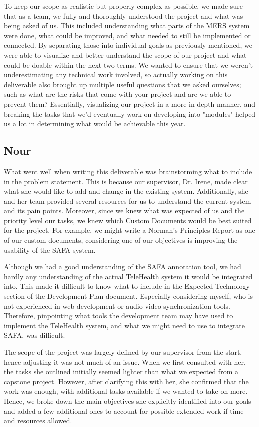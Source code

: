 \documentclass{article}
\begin{document}
To keep our scope as realistic but properly complex as possible, we made sure that as
a team, we fully and thoroughly understood the project and what was being asked of us.
This included understanding what parts of the MERS system were done, what could
be improved, and what needed to still be implemented or connected. By separating those 
into individual goals as previously mentioned, we were able to visualize and
better understand the scope of our project and what could be doable within the next
two terms. We wanted to ensure that we weren't underestimating any technical work
involved, so actually working on this deliverable also brought up multiple 
useful questions that we asked ourselves; such as what are the risks that come with 
your project and are we able to prevent them? Essentially, visualizing our project
in a more in-depth manner, and breaking the tasks that we'd eventually
work on developing into "modules" helped us a lot in determining what would be
achievable this year.

\subsection*{Nour}
What went well when writing this deliverable was brainstorming what to include in the problem statement. 
This is because our supervisor, Dr. Irene, made clear what she would like to add and change in the existing system. 
Additionally, she and her team provided several resources for us to understand the current system and its pain points. 
Moreover, since we knew what was expected of us and the priority level our tasks, we knew which Custom Documents would be best suited for the project. 
For example, we might write a Norman’s Principles Report as one of our custom documents, considering one of our objectives is improving the usability of the SAFA system.

Although we had a good understanding of the SAFA annotation tool, we had hardly any understanding of the actual TeleHealth system it would be integrated into. 
This made it difficult to know what to include in the Expected Technology section of the Development Plan document. 
Especially considering myself, who is not experienced in web-development or audio-video synchronization tools. 
Therefore, pinpointing what tools the development team may have used to implement the TeleHealth system, and what we might need to use to integrate SAFA, was difficult.

The scope of the project was largely defined by our supervisor from the start, hence adjusting it was not much of an issue. 
When we first consulted with her, the tasks she outlined initially seemed lighter than what we expected from a capstone project. 
However, after clarifying this with her, she confirmed that the work was enough, with additional tasks available if we wanted to take on more. 
Hence, we broke down the main objectives she explicitly identified into our goals and added a few additional ones to account for possible extended work if time and resources allowed.
\end{document}
